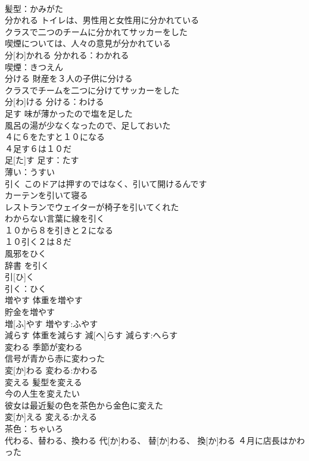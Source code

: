 \documentclass[8pt]{extreport}
\begin{document}
\begin{CJK}{UTF8}{min}
\\	髪型：かみがた
\\	分かれる	トイレは、男性用と女性用に分かれている 
\\	クラスで二つのチームに分かれてサッカーをした 
\\	喫煙については、人々の意見が分かれている 
\\	分[わ]かれる			分かれる：わかれる
\\	喫煙：きつえん
\\	分ける	財産を３人の子供に分ける 
\\	クラスでチームを二つに分けてサッカーをした 
\\	分[わ]ける			分ける：わける
\\	足す	味が薄かったので塩を足した 
\\	風呂の湯が少なくなったので、足しておいた 
\\	４に６をたすと１０になる 
\\	４足す６は１０だ 
\\	足[た]す			足す：たす
\\	薄い：うすい
\\	引く	このドアは押すのではなく、引いて開けるんです 
\\	カーテンを引いて寝る 
\\	レストランでウェイターが椅子を引いてくれた 
\\	わからない言葉に線を引く 
\\	１０から８を引きと２になる 
\\	１０引く２は８だ 
\\	風邪をひく 
\\	辞書 を引く
\\	引[ひ]く		
\\	引く：ひく
\\	増やす	体重を増やす 
\\	貯金を増やす 
\\	増[ふ]やす			増やす:ふやす
\\	減らす	体重を減らす	減[へ]らす			減らす:へらす
\\	変わる	季節が変わる 
\\	信号が青から赤に変わった 
\\	変[か]わる			変わる:かわる
\\	変える	髪型を変える 
\\	今の人生を変えたい 
\\	彼女は最近髪の色を茶色から金色に変えた 
\\	変[か]える			変える:かえる
\\	茶色：ちゃいろ
\\	代わる、替わる、換わる		代[か]わる、 替[か]わる、 換[か]わる	４月に店長はかわった 

\end{CJK}
\end{document}
